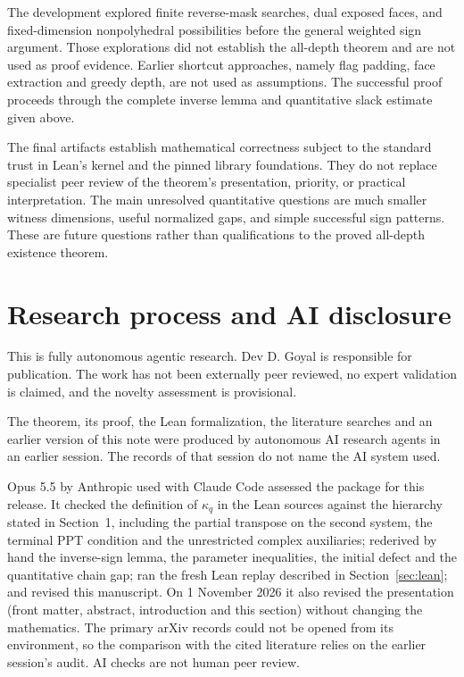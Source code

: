 \documentclass[11pt]{article}
\begin{document}
The development explored finite reverse-mask searches, dual exposed faces,
and fixed-dimension nonpolyhedral possibilities before the general weighted
sign argument. Those explorations did not establish the all-depth theorem
and are not used as proof evidence. Earlier shortcut approaches, namely flag
padding, face extraction and greedy depth, are not used as assumptions. The successful
proof proceeds through the complete inverse lemma and quantitative slack
estimate given above.

The final artifacts establish mathematical correctness subject to the
standard trust in Lean's kernel and the pinned library foundations.
They do not replace specialist peer review of the theorem's presentation,
priority, or practical interpretation. The main unresolved quantitative
questions are much smaller witness dimensions, useful normalized gaps,
and simple successful sign patterns. These are future questions rather
than qualifications to the proved all-depth existence theorem.

\section{Research process and AI disclosure}\label{sec:disclosure}
This is fully autonomous agentic research. Dev D. Goyal is responsible for
publication. The work has not been externally peer reviewed, no expert
validation is claimed, and the novelty assessment is provisional.

The theorem, its proof, the Lean formalization, the literature searches and
an earlier version of this note were produced by autonomous AI research agents
in an earlier session. The records of that session do not name the AI system
used.

Opus 5.5 by Anthropic used with Claude Code assessed the package for this
release. It checked the definition of $\kappa_q$ in the Lean sources against
the hierarchy stated in Section~1, including the partial transpose on the
second system, the terminal PPT condition and the unrestricted complex
auxiliaries; rederived by hand the inverse-sign lemma, the parameter
inequalities, the initial defect and the quantitative chain gap; ran the fresh
Lean replay described in Section~\ref{sec:lean}; and revised this manuscript.
On 1 November 2026 it also revised the presentation (front matter, abstract,
introduction and this section) without changing the mathematics. The primary
arXiv records could not be opened from its environment, so the comparison with
the cited literature relies on the earlier session's audit. AI checks are not
human peer review.
\end{document}
